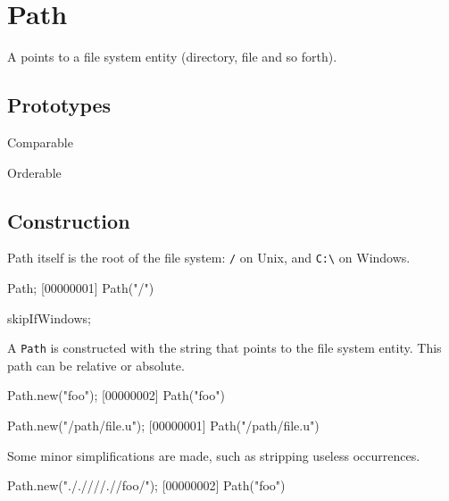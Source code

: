 
\section{Path}

A  points to a file system entity (directory, file and so
forth).

\subsection{Prototypes}
\begin{refObjects}
\item[Comparable]
\item[Orderable]
\end{refObjects}

\subsection{Construction}

Path itself is the root of the file system: \lstinline|/| on Unix, and
\lstinline|C:\| on Windows.

\begin{urbiscript}[firstnumber=1]
Path;
[00000001] Path("/")
\end{urbiscript}
\begin{urbicomment}
skipIfWindows;
\end{urbicomment}

A \lstinline|Path| is constructed with the string that points to the file
system entity.  This path can be relative or absolute.

\begin{urbiscript}[firstnumber=1]
Path.new("foo");
[00000002] Path("foo")

Path.new("/path/file.u");
[00000001] Path("/path/file.u")
\end{urbiscript}

Some minor simplifications are made, such as stripping useless
 occurrences.

\begin{urbiscript}
Path.new("././///.//foo/");
[00000002] Path("foo")
\end{urbiscript}

